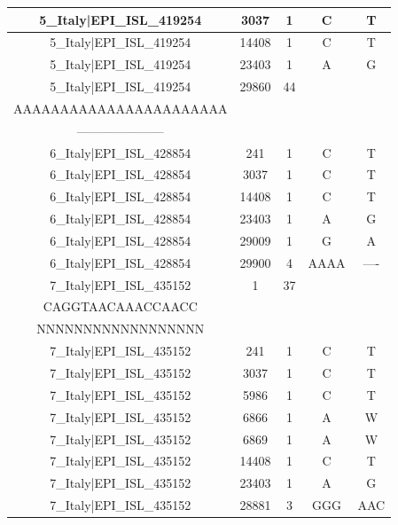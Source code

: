 \documentclass[a4paper,10pt]{article}
\begin{document}
\begin{longtable}{@{}ccccc@{}}
5\_Italy|EPI\_ISL\_419254 & 3037 & 1 & C & T \\* \midrule
5\_Italy|EPI\_ISL\_419254 & 14408 & 1 & C & T \\* \midrule
5\_Italy|EPI\_ISL\_419254 & 23403 & 1 & A & G \\* \midrule
5\_Italy|EPI\_ISL\_419254 & 29860 & 44 & \begin{tabular}[c]{@{}c@{}}AGGAGAATGACAAAAAAAAAA\\ AAAAAAAAAAAAAAAAAAAAAAA\end{tabular} & \begin{tabular}[c]{@{}c@{}}-----------------------\\ ---------------------\end{tabular} \\* \midrule
6\_Italy|EPI\_ISL\_428854 & 241 & 1 & C & T \\* \midrule
6\_Italy|EPI\_ISL\_428854 & 3037 & 1 & C & T \\* \midrule
6\_Italy|EPI\_ISL\_428854 & 14408 & 1 & C & T \\* \midrule
6\_Italy|EPI\_ISL\_428854 & 23403 & 1 & A & G \\* \midrule
6\_Italy|EPI\_ISL\_428854 & 29009 & 1 & G & A \\* \midrule
6\_Italy|EPI\_ISL\_428854 & 29900 & 4 & AAAA & ---- \\* \midrule
7\_Italy|EPI\_ISL\_435152 & 1 & 37 & \begin{tabular}[c]{@{}c@{}}ATTAAAGGTTTATACCTTCC\\ CAGGTAACAAACCAACC\end{tabular} & \begin{tabular}[c]{@{}c@{}}NNNNNNNNNNNNNNNNNNN\\ NNNNNNNNNNNNNNNNNN\end{tabular} \\* \midrule
7\_Italy|EPI\_ISL\_435152 & 241 & 1 & C & T \\* \midrule
7\_Italy|EPI\_ISL\_435152 & 3037 & 1 & C & T \\* \midrule
7\_Italy|EPI\_ISL\_435152 & 5986 & 1 & C & T \\* \midrule
7\_Italy|EPI\_ISL\_435152 & 6866 & 1 & A & W \\* \midrule
7\_Italy|EPI\_ISL\_435152 & 6869 & 1 & A & W \\* \midrule
7\_Italy|EPI\_ISL\_435152 & 14408 & 1 & C & T \\* \midrule
7\_Italy|EPI\_ISL\_435152 & 23403 & 1 & A & G \\* \midrule
7\_Italy|EPI\_ISL\_435152 & 28881 & 3 & GGG & AAC \\* \midrule

\end{longtable}
\end{document}
